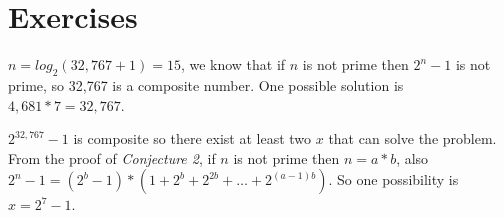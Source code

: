 \section{Exercises}


\sol $n = log_2(32,767+1) = 15$, we know that if $n$ is not prime then $2^n - 1$ is not prime,
so 32,767 is a composite number. One possible solution is $4,681 * 7 = 32,767$.


\sol $2^{32,767} - 1$ is composite so there exist at least two $x$ that can solve the problem.
From the proof of \textit{Conjecture 2}, if $n$ is not prime then $n = a*b$,
also $2^n - 1 = (2^b - 1) * (1 + 2^b + 2^{2b} + \ldots + 2^{(a-1)b})$. So one possibility is $x = 2^7 - 1$.

